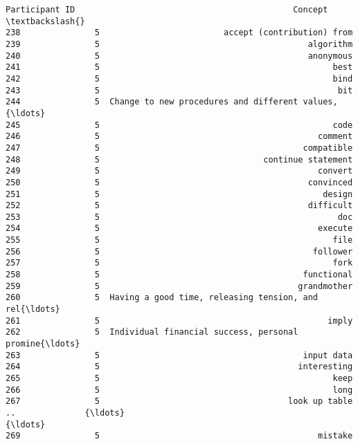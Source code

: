 \documentclass[11pt]{article}
\begin{document}
    \begin{Verbatim}[commandchars=\\\{\}]
     Participant ID                                            Concept  \textbackslash{}
238               5                         accept (contribution) from   
239               5                                          algorithm   
240               5                                          anonymous   
241               5                                               best   
242               5                                               bind   
243               5                                                bit   
244               5  Change to new procedures and different values,{\ldots}   
245               5                                               code   
246               5                                            comment   
247               5                                         compatible   
248               5                                 continue statement   
249               5                                            convert   
250               5                                          convinced   
251               5                                             design   
252               5                                          difficult   
253               5                                                doc   
254               5                                            execute   
255               5                                               file   
256               5                                           follower   
257               5                                               fork   
258               5                                         functional   
259               5                                        grandmother   
260               5  Having a good time, releasing tension, and rel{\ldots}   
261               5                                              imply   
262               5  Individual financial success, personal promine{\ldots}   
263               5                                         input data   
264               5                                        interesting   
265               5                                               keep   
266               5                                               long   
267               5                                      look up table   
..              {\ldots}                                                {\ldots}   
269               5                                            mistake   

\end{Verbatim}
\end{document}
